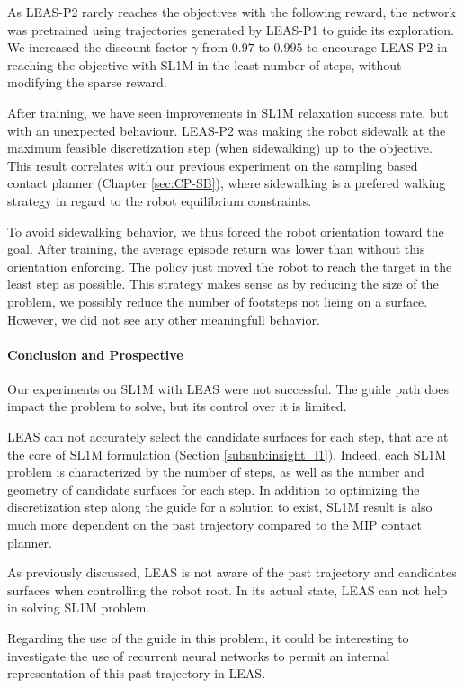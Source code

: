As LEAS-P2 rarely reaches the objectives with the following reward, the network was pretrained using trajectories generated by LEAS-P1 to guide its exploration.
We increased the discount factor $\gamma$ from $0.97$ to $0.995$ to encourage LEAS-P2 in reaching the objective with SL1M in the least number of steps, without modifying the sparse reward.

After training, we have seen improvements in SL1M relaxation success rate, but with an unexpected behaviour.
LEAS-P2 was making the robot sidewalk at the maximum feasible discretization step (when sidewalking) up to the objective.
This result correlates with our previous experiment on the sampling based contact planner (Chapter \ref{sec:CP-SB}), where sidewalking is a prefered walking strategy in regard to the robot equilibrium constraints.

To avoid sidewalking behavior, we thus forced the robot orientation toward the goal.
After training, the average episode return was lower than without this orientation enforcing.
The policy just moved the robot to reach the target in the least step as possible.
This strategy makes sense as by reducing the size of the problem, we possibly reduce the number of footsteps not lieing on a surface.
However, we did not see any other meaningfull behavior.

\paragraph{Conclusion and Prospective}

Our experiments on SL1M with LEAS were not successful.
The guide path does impact the problem to solve, but its control over it is limited.

LEAS can not accurately select the candidate surfaces for each step, that are at the core of SL1M formulation (Section \ref{subsub:insight_l1}). 
Indeed, each SL1M problem is characterized by the number of steps, as well as the number and geometry of candidate surfaces for each step.
In addition to optimizing the discretization step along the guide for a solution to exist, SL1M result is also much more dependent on the past trajectory compared to the MIP contact planner.

As previously discussed, LEAS is not aware of the past trajectory and candidates surfaces when controlling the robot root. In its actual state, LEAS can not help in solving SL1M problem.

Regarding the use of the guide in this problem, it could be interesting to investigate the use of recurrent neural networks to permit an internal representation of this past trajectory in LEAS.

